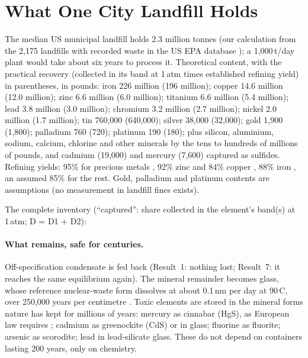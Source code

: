 \documentclass[11pt,a4paper]{article}
\begin{document}
\section{What One City Landfill Holds}\label{ch:landfill}
The median US municipal landfill holds 2.3 million tonnes (our calculation from the 2,175 landfills with recorded waste in the US EPA database \citep{epa2024lmop}); a 1,000\,t/day plant would take about six years to process it. Theoretical content, with the practical recovery (collected in its band at 1\,atm times established refining yield) in parentheses, in pounds: iron 226 million (196 million); copper 14.6 million (12.0 million); zinc 6.6 million (6.0 million); titanium 6.6 million (5.4 million); lead 3.8 million (3.0 million); chromium 3.2 million (2.7 million); nickel 2.0 million (1.7 million); tin 760,000 (640,000); silver 38,000 (32,000); gold 1,900 (1,800); palladium 760 (720); platinum 190 (180); plus silicon, aluminium, sodium, calcium, chlorine and other minerals by the tens to hundreds of millions of pounds, and cadmium (19,000) and mercury (7,600) captured as sulfides. Refining yields: 95\% for precious metals \citep{hageluken2010}, 92\% zinc and 84\% copper \citep{cusano2017bref}, 88\% iron \citep{remus2013bref}, an assumed 85\% for the rest. Gold, palladium and platinum contents are assumptions (no measurement in landfill fines exists).

\noindent The complete inventory (``captured'': share collected in the element's band(s) at 1\,atm; D = D1 + D2):


\paragraph{What remains, safe for centuries.} Off-specification condensate is fed back (Result~1: nothing lost; Result~7: it reaches the same equilibrium again). The mineral remainder becomes glass, whose reference nuclear-waste form dissolves at about 0.1\,nm per day at 90\,\textdegree C, over 250,000 years per centimetre \citep{gin2015}. Toxic elements are stored in the mineral forms nature has kept for millions of years: mercury as cinnabar (HgS), as European law requires \citep{eu2017mercury}; cadmium as greenockite (CdS) or in glass; fluorine as fluorite; arsenic as scorodite; lead in lead-silicate glass. These do not depend on containers lasting 200 years, only on chemistry.

\end{document}
